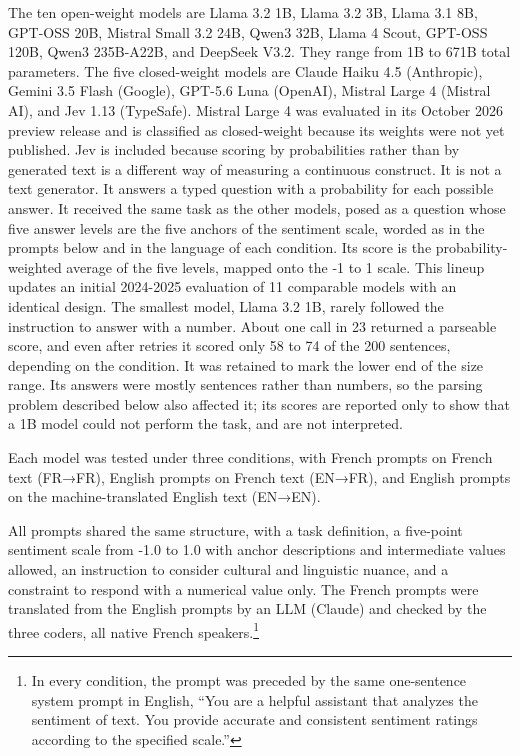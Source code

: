 \documentclass[
  man,
  floatsintext,
  longtable,
  nolmodern,
  notxfonts,
  notimes,
  colorlinks=true,linkcolor=blue,citecolor=blue,urlcolor=blue]{apa7}
\begin{document}
The ten open-weight models are Llama 3.2 1B, Llama 3.2 3B, Llama 3.1 8B,
GPT-OSS 20B, Mistral Small 3.2 24B, Qwen3 32B, Llama 4 Scout, GPT-OSS
120B, Qwen3 235B-A22B, and DeepSeek V3.2. They range from 1B to 671B
total parameters. The five closed-weight models are Claude Haiku 4.5
(Anthropic), Gemini 3.5 Flash (Google), GPT-5.6 Luna (OpenAI), Mistral
Large 4 (Mistral AI), and Jev 1.13 (TypeSafe). Mistral Large 4 was
evaluated in its October 2026 preview release and is classified as
closed-weight because its weights were not yet published. Jev is
included because scoring by probabilities rather than by generated text
is a different way of measuring a continuous construct. It is not a text
generator. It answers a typed question with a probability for each
possible answer. It received the same task as the other models, posed as
a question whose five answer levels are the five anchors of the
sentiment scale, worded as in the prompts below and in the language of
each condition. Its score is the probability-weighted average of the
five levels, mapped onto the -1 to 1 scale. This lineup updates an
initial 2024-2025 evaluation of 11 comparable models with an identical
design. The smallest model, Llama 3.2 1B, rarely followed the
instruction to answer with a number. About one call in 23 returned a
parseable score, and even after retries it scored only 58 to 74 of the
200 sentences, depending on the condition. It was retained to mark the
lower end of the size range. Its answers were mostly sentences rather
than numbers, so the parsing problem described below also affected it;
its scores are reported only to show that a 1B model could not perform
the task, and are not interpreted.

Each model was tested under three conditions, with French prompts on
French text (FR→FR), English prompts on French text (EN→FR), and English
prompts on the machine-translated English text (EN→EN).

All prompts shared the same structure, with a task definition, a
five-point sentiment scale from -1.0 to 1.0 with anchor descriptions and
intermediate values allowed, an instruction to consider cultural and
linguistic nuance, and a constraint to respond with a numerical value
only. The French prompts were translated from the English prompts by an
LLM (Claude) and checked by the three coders, all native French
speakers.\footnote{In every condition, the prompt was preceded by the
  same one-sentence system prompt in English, ``You are a helpful
  assistant that analyzes the sentiment of text. You provide accurate
  and consistent sentiment ratings according to the specified scale.''}
\end{document}
